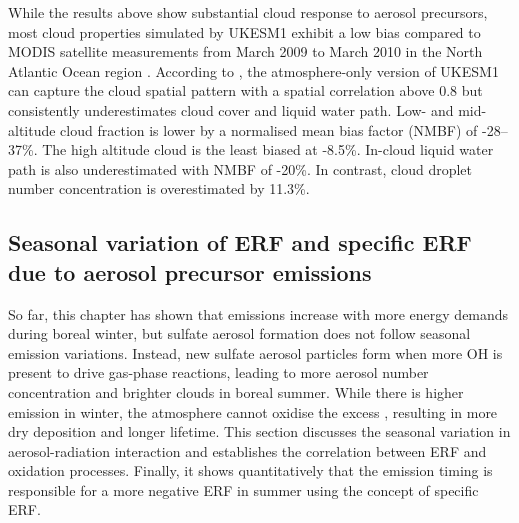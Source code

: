 While the results above show substantial cloud response to aerosol precursors, most cloud properties simulated by UKESM1 exhibit a low bias compared to MODIS satellite measurements from March 2009 to March 2010 in the North Atlantic Ocean region \citep{grosvenorDecompositionCloudAerosol2020}. According to \citet{grosvenorDecompositionCloudAerosol2020}, the atmosphere-only version of UKESM1 can capture the cloud spatial pattern with a spatial correlation above 0.8 but consistently underestimates cloud cover and liquid water path. Low- and mid-altitude cloud fraction is lower by a normalised mean bias factor (NMBF) of -28--37\%. The high altitude cloud is the least biased at -8.5\%. In-cloud liquid water path is also underestimated with NMBF of -20\%. In contrast, cloud droplet number concentration is overestimated by 11.3\%.




\subsection{Seasonal variation of ERF and specific ERF due to aerosol precursor emissions}

So far, this chapter has shown that  emissions increase with more energy demands during boreal winter, but sulfate aerosol formation does not follow seasonal emission variations. Instead, new sulfate aerosol particles form when more OH is present to drive gas-phase reactions, leading to more aerosol number concentration and brighter clouds in boreal summer. While there is higher emission in winter, the atmosphere cannot oxidise the excess , resulting in more dry deposition and longer  lifetime. This section discusses the seasonal variation in aerosol-radiation interaction and establishes the correlation between ERF and oxidation processes. Finally, it shows quantitatively that the emission timing is responsible for a more negative ERF in summer using the concept of specific ERF.


